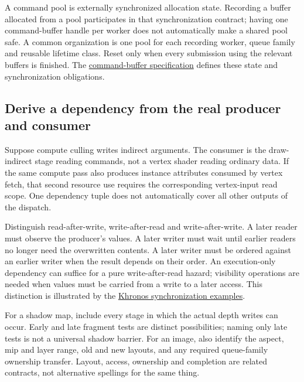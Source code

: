 A command pool is externally synchronized allocation state. Recording a buffer allocated from a pool participates in that synchronization contract; having one command-buffer handle per worker does not automatically make a shared pool safe. A common organization is one pool for each recording worker, queue family and reusable lifetime class. Reset only when every submission using the relevant buffers is finished. The \href{https://docs.vulkan.org/spec/latest/chapters/cmdbuffers.html}{command-buffer specification} defines these state and synchronization obligations.

\subsection{Derive a dependency from the real producer and consumer}\label{01-foundations-i-ch011-derive-a-dependency-from-the-real-producer-and-consumer}

\hypertarget{01-foundations-i-ch011-derive-a-dependency-from-the-real-producer-and-consumer}{}

Suppose compute culling writes indirect arguments. The consumer is the draw-indirect stage reading commands, not a vertex shader reading ordinary data. If the same compute pass also produces instance attributes consumed by vertex fetch, that second resource use requires the corresponding vertex-input read scope. One dependency tuple does not automatically cover all other outputs of the dispatch.

Distinguish read-after-write, write-after-read and write-after-write. A later reader must observe the producer's values. A later writer must wait until earlier readers no longer need the overwritten contents. A later writer must be ordered against an earlier writer when the result depends on their order. An execution-only dependency can suffice for a pure write-after-read hazard; visibility operations are needed when values must be carried from a write to a later access. This distinction is illustrated by the \href{https://docs.vulkan.org/guide/latest/synchronization_examples.html}{Khronos synchronization examples}.

For a shadow map, include every stage in which the actual depth writes can occur. Early and late fragment tests are distinct possibilities; naming only late tests is not a universal shadow barrier. For an image, also identify the aspect, mip and layer range, old and new layouts, and any required queue-family ownership transfer. Layout, access, ownership and completion are related contracts, not alternative spellings for the same thing.

